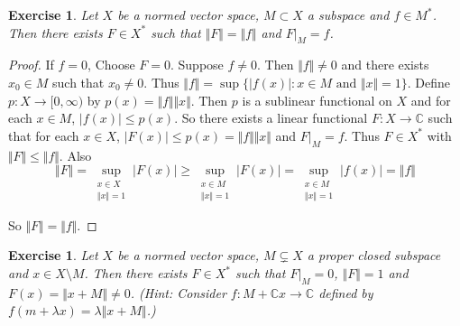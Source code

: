 \documentclass[12pt]{amsart}
\newtheorem{ex}[thm]{Exercise}
\newcommand{\lam}{\lambda}
\newcommand{\C}{\mathbb{C}}
\newcommand{\Rg}{[0,\infty)}
\newcommand{\n}{\Vert}
\begin{document}
\begin{ex}
Let $X$ be a normed vector space, $M \subset X$ a subspace and $f \in M^*$. Then there exists $F \in X^*$ such that $\n F \n = \n f \n$ and $F|_M = f$.  
\end{ex}

\begin{proof}
If $f =0$, Choose $F=0$. Suppose $f \neq 0$. Then $\n f \n \neq 0$ and there exists $x_0 \in M$ such that $x_0  \neq 0$. Thus $\n f \n = \sup \{ \vert f(x) \vert: x \in M \text{ and } \n x \n = 1\}$. Define $p:X \rightarrow \Rg$ by $ p(x) = \n f \n \n x \n $. Then $p$ is a sublinear functional on $X$ and for each $x \in M$, $\vert f(x) \vert \leq p(x)$. So there exists a linear functional $F:X \rightarrow \C$ such that for each $x \in X$, $\vert F(x) \vert \leq p(x) = \n f \n \n x \n$ and $F|_M = f$. Thus $F \in X^*$ with $\n F \n \leq \n f \n$. Also $$\n F \n = \sup_{\substack{ x \in X \\ \n x \n = 1}} \vert F(x) \vert \geq  \sup_{\substack{ x \in M \\ \n x \n = 1}} \vert F(x) \vert = \sup_{\substack{ x \in M \\ \n x \n = 1}} \vert f(x) \vert = \n f \n $$

So $\n F \n = \n f \n$.
\end{proof}

\begin{ex}
Let $X$ be a normed vector space, $M \subsetneq X$ a proper closed subspace and $x \in X \setminus M$. Then there exists $F \in X^*$ such that $F|_M = 0$, $\n F \n =1$ and $ F(x) = \n x+M \n \neq 0$. (Hint: Consider $f:M+\C x \rightarrow \C$ defined by $f(m+\lam x) = \lam \n x +M \n$.)
\end{ex}
\end{document}
